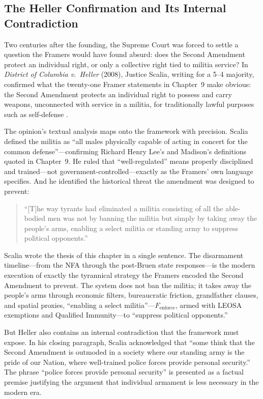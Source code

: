\documentclass[12pt,openany]{book}
\begin{document}
\subsection{The Heller Confirmation and Its Internal Contradiction}

Two centuries after the founding, the Supreme Court was forced to settle a question the Framers would have found absurd: does the Second Amendment protect an individual right, or only a collective right tied to militia service? In \textit{District of Columbia v.\ Heller} (2008), Justice Scalia, writing for a 5--4 majority, confirmed what the twenty-one Framer statements in Chapter~9 make obvious: the Second Amendment protects an individual right to possess and carry weapons, unconnected with service in a militia, for traditionally lawful purposes such as self-defense \cite{heller}.

The opinion's textual analysis maps onto the framework with precision. Scalia defined the militia as ``all males physically capable of acting in concert for the common defense''---confirming Richard Henry Lee's and Madison's definitions quoted in Chapter~9. He ruled that ``well-regulated'' means properly disciplined and trained---not government-controlled---exactly as the Framers' own language specifies. And he identified the historical threat the amendment was designed to prevent:

\begin{quote}
``[T]he way tyrants had eliminated a militia consisting of all the able-bodied men was not by banning the militia but simply by taking away the people's arms, enabling a select militia or standing army to suppress political opponents.'' \cite{heller}
\end{quote}

Scalia wrote the thesis of this chapter in a single sentence. The disarmament timeline---from the NFA through the post-Bruen state responses---is the modern execution of exactly the tyrannical strategy the Framers encoded the Second Amendment to prevent. The system does not ban the militia; it takes away the people's arms through economic filters, bureaucratic friction, grandfather clauses, and spatial proxies, ``enabling a select militia''---$F_{\text{enforce}}$, armed with LEOSA exemptions and Qualified Immunity---to ``suppress political opponents.''

But Heller also contains an internal contradiction that the framework must expose. In his closing paragraph, Scalia acknowledged that ``some think that the Second Amendment is outmoded in a society where our standing army is the pride of our Nation, where well-trained police forces provide personal security.'' The phrase ``police forces provide personal security'' is presented as a factual premise justifying the argument that individual armament is less necessary in the modern era.
\end{document}
